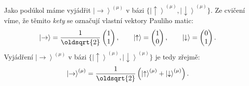 \documentclass[10pt,a4paper]{article}
\newcommand{\mat}[1]{
    \begin{pmatrix}
        #1
    \end{pmatrix}
}
\newcommand{\ket}[1]{\left| #1 \right>}
\begin{document}
Jako podúkol máme vyjádřit $\ket{\rightarrow}^{(\mu)}$ v bázi $\{ \ket{\uparrow}^{(\mu)}, \ket{\downarrow}^{(\mu)} \}$. Ze cvičení víme, že těmito \textit{kety} se označují vlastní vektory Pauliho matic:
\begin{align*}
    \ket{\rightarrow} = \frac{1}{\oldsqrt{2}} \mat{1 \\ 1},
    \hspace{2em}
    \ket{\uparrow} = \mat{1 \\ 0},
    \hspace{2em}
    \ket{\downarrow} = \mat{0 \\ 1}.
\end{align*}
Vyjádření $\ket{\rightarrow}^{(\mu)}$ v bázi $\{ \ket{\uparrow}^{(\mu)}, \ket{\downarrow}^{(\mu)} \}$ je tedy zřejmě:
\begin{align*}
    \ket{\rightarrow}^{(\mu)} = \frac{1}{\oldsqrt{2}} \left(\ket{\uparrow}^{(\mu)} + \ket{\downarrow}^{(\mu)} \right).
\end{align*}
\end{document}
